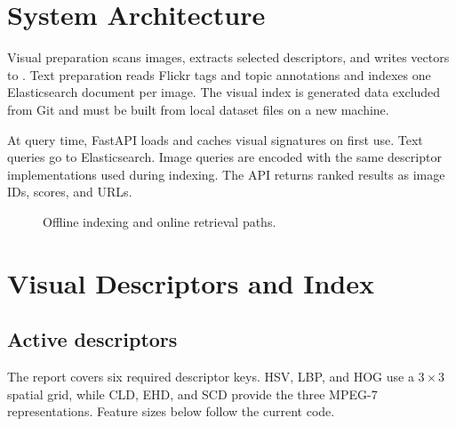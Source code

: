 \documentclass[12pt,a4paper]{article}
\begin{document}
\section{System Architecture}
Visual preparation scans images, extracts selected descriptors, and writes
vectors to . Text preparation reads Flickr tags and
topic annotations and indexes one Elasticsearch document per image. The visual
index is generated data excluded from Git and must be built from local dataset
files on a new machine.

At query time, FastAPI loads and caches visual signatures on first use. Text
queries go to Elasticsearch. Image queries are encoded with the same descriptor
implementations used during indexing. The API returns ranked results as image
IDs, scores, and URLs.

\begin{figure}[H]
\centering
{}
\caption{Offline indexing and online retrieval paths.}
\label{fig:architecture}
\end{figure}

\section{Visual Descriptors and Index}
\subsection{Active descriptors}
The report covers six required descriptor keys. HSV, LBP, and HOG use a
$3\times3$ spatial grid, while CLD, EHD, and SCD provide the three MPEG-7
representations. Feature sizes below follow the current code.
\end{document}
